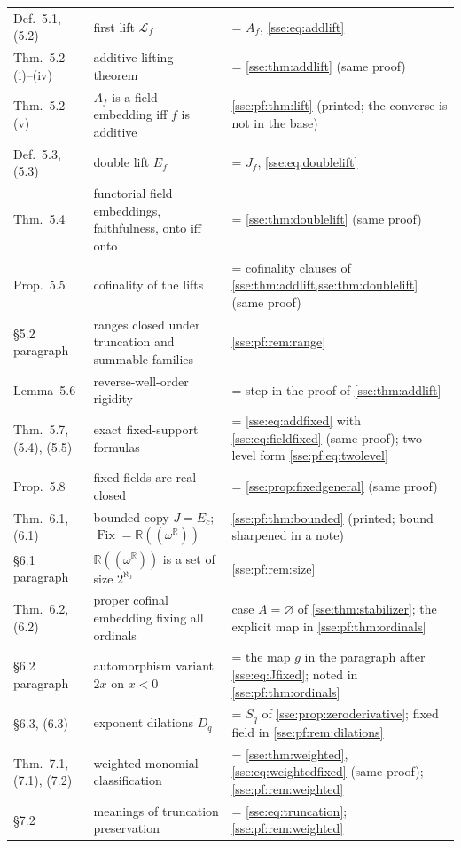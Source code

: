 \documentclass[11pt,a4paper]{article}
\numberwithin{equation}{section}
\theoremstyle{plain}
\theoremstyle{definition}
\theoremstyle{remark}
\newcommand{\R}{\mathbb{R}}
\newcommand{\Fix}{\operatorname{Fix}}
\newcommand{\NF}[1]{\R((\omega^{#1}))}
\begin{document}
\begin{longtable}{P{27mm}P{50mm}P{71mm}}
Def.~5.1, (5.2) & first lift $\mathcal L_f$ & = $A_f$, \eqref{sse:eq:addlift} \\
Thm.~5.2 (i)--(iv) & additive lifting theorem & = \cref{sse:thm:addlift} (same proof) \\
Thm.~5.2 (v) & $A_f$ is a field embedding iff $f$ is additive & \cref{sse:pf:thm:lift} (printed; the converse is not in the base) \\
Def.~5.3, (5.3) & double lift $E_f$ & = $J_f$, \eqref{sse:eq:doublelift} \\
Thm.~5.4 & functorial field embeddings, faithfulness, onto iff onto & = \cref{sse:thm:doublelift} (same proof) \\
Prop.~5.5 & cofinality of the lifts & = cofinality clauses of \cref{sse:thm:addlift,sse:thm:doublelift} (same proof) \\
\S5.2 paragraph & ranges closed under truncation and summable families & \cref{sse:pf:rem:range} \\
Lemma~5.6 & reverse-well-order rigidity & = step in the proof of \cref{sse:thm:addlift} \\
Thm.~5.7, (5.4), (5.5) & exact fixed-support formulas & = \eqref{sse:eq:addfixed} with \eqref{sse:eq:fieldfixed} (same proof); two-level form \eqref{sse:pf:eq:twolevel} \\
Prop.~5.8 & fixed fields are real closed & = \cref{sse:prop:fixedgeneral} (same proof) \\
Thm.~6.1, (6.1) & bounded copy $J=E_c$; $\Fix=\NF{\R}$ & \cref{sse:pf:thm:bounded} (printed; bound sharpened in a note) \\
\S6.1 paragraph & $\NF{\R}$ is a set of size $2^{\aleph_0}$ & \cref{sse:pf:rem:size} \\
Thm.~6.2, (6.2) & proper cofinal embedding fixing all ordinals & case $A=\varnothing$ of \cref{sse:thm:stabilizer}; the explicit map in \cref{sse:pf:thm:ordinals} \\
\S6.2 paragraph & automorphism variant $2x$ on $x<0$ & = the map $g$ in the paragraph after \eqref{sse:eq:Jfixed}; noted in \cref{sse:pf:thm:ordinals} \\
\S6.3, (6.3) & exponent dilations $D_q$ & = $S_q$ of \cref{sse:prop:zeroderivative}; fixed field in \cref{sse:pf:rem:dilations} \\
Thm.~7.1, (7.1), (7.2) & weighted monomial classification & = \cref{sse:thm:weighted}, \eqref{sse:eq:weightedfixed} (same proof); \cref{sse:pf:rem:weighted} \\
\S7.2 & meanings of truncation preservation & = \eqref{sse:eq:truncation}; \cref{sse:pf:rem:weighted} \\

\end{longtable}
\end{document}
